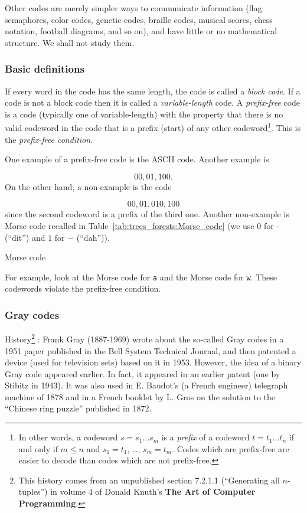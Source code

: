 Other codes are merely simpler ways to communicate information
(flag semaphores, color codes, genetic codes, braille codes, musical scores, chess
notation, football diagrams, and so on), and have little or no
mathematical structure. We shall not study them.



\subsubsection{Basic definitions}

If every word in the code has the same length, the code is called
a {\it block code}. If a code is not a block code then it is called
a {\it variable-length} code.
A {\it prefix-free} code is a code (typically one of variable-length)
with the property that there is no valid codeword in the code that
is a prefix (start) of any other codeword\footnote{In other words,
a codeword $s=s_1 \dots s_m$ is a {\it prefix} of a codeword
$t=t_1\dots t_n$ if and only if $m\leq n$ and
$s_1=t_1$, \dots, $s_m=t_m$. Codes which are prefix-free are easier
to decode than codes which are not prefix-free.}.
This is the {\it prefix-free condition}.

One example of a prefix-free code is the ASCII code.
Another example is

\[
00, 01, 100.
\]
On the other hand, a non-example is the code

\[
00, 01, 010, 100
\]
since the second codeword is a prefix of the third one.
Another non-example is Morse code recalled in
Table~\ref{tab:trees_forests:Morse_code} (we use $0$ for
$\cdot$ (``dit'') and $1$ for $-$ (``dah'')).

\begin{table}[!htbp]
\centering

\caption{Morse code}
\label{tab:trees_forests:Morse_code}
\end{table}

For example, look at the Morse code for {\tt a} and the Morse code for
{\tt w}. These codewords violate the prefix-free condition.

\subsubsection{Gray codes}

History\footnote{This
history comes from an unpublished section 7.2.1.1
(``Generating all $n$-tuples'')
in volume 4 of Donald Knuth's {\bf The Art of Computer Programming}.
}
: Frank Gray (1887-1969) wrote about the so-called Gray codes in a
1951 paper published in the Bell System Technical Journal,
and then patented a device (used for television sets)
based on it in 1953. However, the idea of a binary Gray code
appeared earlier. In fact, it appeared in an earlier patent
(one by Stibitz in 1943). It was also used in E. Baudot's
(a French engineer) telegraph machine of 1878 and in
a French booklet by L. Gros on the solution to the
``Chinese ring puzzle'' published in 1872.

